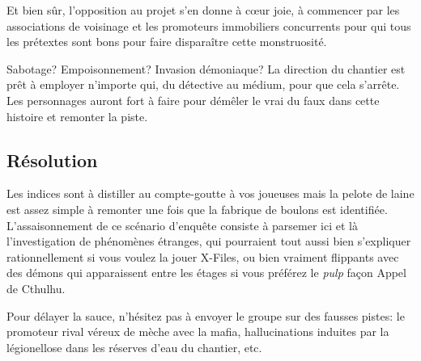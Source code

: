 Et bien sûr, l'opposition au projet s'en donne à cœur joie, à commencer par les associations de voisinage et les promoteurs immobiliers concurrents pour qui tous les prétextes sont bons pour faire disparaître cette monstruosité.

Sabotage? Empoisonnement? Invasion démoniaque? La direction du chantier est prêt à employer n'importe qui, du détective au médium, pour que cela s'arrête.
Les personnages auront fort à faire pour démêler le vrai du faux dans cette histoire et remonter la piste.

\subsection{Résolution}

Les indices sont à distiller au compte-goutte à vos joueuses mais la pelote de laine est assez simple à remonter une fois que la fabrique de boulons est identifiée.
L'assaisonnement de ce scénario d'enquête consiste à parsemer ici et là l'investigation de phénomènes étranges, qui pourraient tout aussi bien s'expliquer rationnellement si vous voulez la jouer X-Files, ou bien vraiment flippants avec des démons qui apparaissent entre les étages si vous préférez le \emph{pulp} façon Appel de Cthulhu.

Pour délayer la sauce, n'hésitez pas à envoyer le groupe sur des fausses pistes: le promoteur rival véreux de mèche avec la mafia, hallucinations induites par la légionellose dans les réserves d'eau du chantier, etc.

\vfill
{}
\vfill
